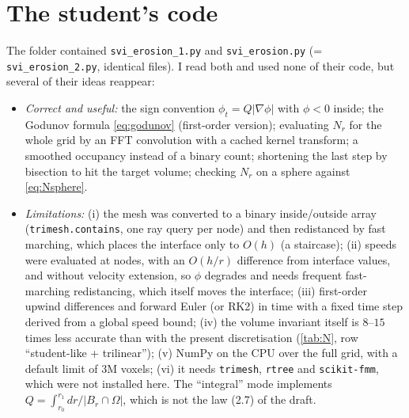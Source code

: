 \documentclass[11pt]{article}
\newcommand{\N}{N_r}
\newcommand{\code}[1]{\texttt{#1}}
\begin{document}
\section{The student's code}

The folder contained \code{svi\_erosion\_1.py} and \code{svi\_erosion.py} (= \code{svi\_erosion\_2.py},
identical files). I read both and used none of their code, but several of their ideas reappear:
\begin{itemize}
\item \emph{Correct and useful:} the sign convention $\phi_t=Q|\nabla\phi|$ with $\phi<0$ inside; the
Godunov formula \eqref{eq:godunov} (first-order version); evaluating $\N$ for the whole grid by an FFT
convolution with a cached kernel transform; a smoothed occupancy instead of a binary count; shortening the
last step by bisection to hit the target volume; checking $\N$ on a sphere against \eqref{eq:Nsphere}.
\item \emph{Limitations:} (i) the mesh was converted to a binary inside/outside array
(\code{trimesh.contains}, one ray query per node) and then redistanced by fast marching, which places
the interface only to $O(h)$ (a staircase); (ii) speeds were evaluated at nodes, with an $O(h/r)$
difference from interface values, and without velocity extension, so $\phi$ degrades and needs frequent
fast-marching redistancing, which itself moves the interface; (iii) first-order upwind differences and
forward Euler (or RK2) in time with a fixed time step derived from a global speed bound; (iv) the
volume invariant itself is $8$--$15$ times less accurate than with the present discretisation
(\cref{tab:N}, row ``student-like + trilinear'');
(v) NumPy on the CPU over the full grid, with a default limit of $3$M voxels; (vi) it needs
\code{trimesh}, \code{rtree} and \code{scikit-fmm}, which were not installed here. The ``integral'' mode
implements $Q=\int_{r_0}^{r_1}dr/|B_r\cap\Omega|$, which is not the law (2.7) of the draft.
\end{itemize}

\end{document}
